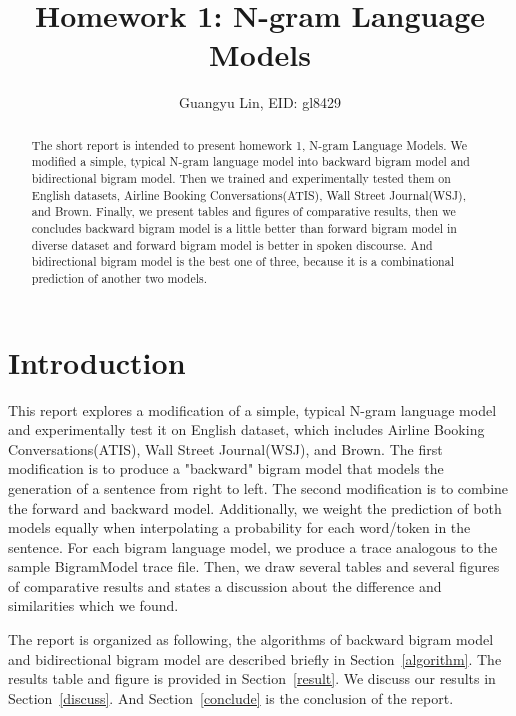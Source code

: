 \documentclass[journal, a4paper]{IEEEtran}
\begin{document}
	\title{Homework 1: N-gram Language Models}
	\author{Guangyu Lin, EID: gl8429
}
	\maketitle

\begin{abstract}
	The short report is intended to present homework 1, N-gram Language Models. We modified a simple, typical N-gram language model into backward bigram model and bidirectional bigram model. Then we trained and experimentally tested them on English datasets, Airline Booking Conversations(ATIS), Wall Street Journal(WSJ), and Brown. Finally, we present tables and figures of comparative results, then we concludes backward bigram model is a little better than forward bigram model in diverse dataset and forward bigram model is better in spoken discourse. And bidirectional bigram model is the best one of three, because it is a combinational prediction of another two models.
\end{abstract}

\section{Introduction}
	This report explores a modification of a simple, typical N-gram language model~\cite{MJH06} and experimentally test it on English dataset, which includes Airline Booking Conversations(ATIS), Wall Street Journal(WSJ), and Brown. The first modification is to produce a "backward" bigram model that models the generation of a sentence from right to left. The second modification is to combine the forward and backward model. Additionally, we weight the prediction of both models equally when interpolating a probability for each word/token in the sentence. For each bigram language model, we produce a trace analogous to the sample BigramModel trace file. Then, we draw several tables and several figures of comparative results and states a discussion about the difference and similarities which we found.~\cite{HOP96}
	
	The report is organized as following, the algorithms of backward bigram model and bidirectional bigram model are described briefly in Section~\ref{algorithm}. The results table and figure is provided in Section~\ref{result}. We discuss our results in Section~\ref{discuss}. And Section~\ref{conclude} is the conclusion of the report.
\end{document}
